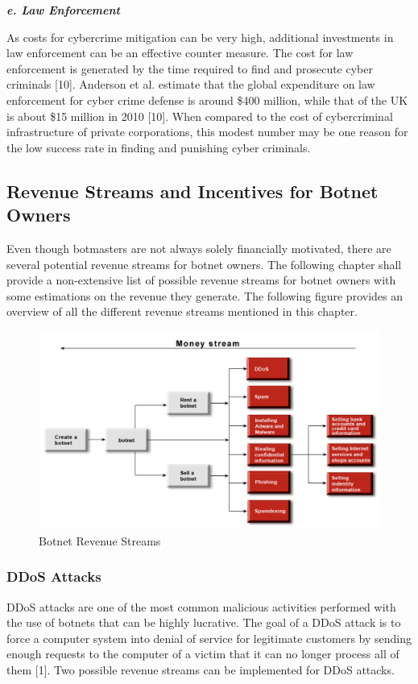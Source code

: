 			\textbf{\textit{e. Law Enforcement}}
			
		As costs for cybercrime mitigation can be very high, additional investments in law enforcement can be an effective counter measure. The cost for law enforcement is generated by the time required to find and prosecute cyber criminals [10]. Anderson et al. estimate that the global expenditure on law enforcement for cyber crime defense is around \$400 million, while that of the UK is about \$15 million in 2010 [10]. When compared to the cost of cybercriminal infrastructure of private corporations, this modest number may be one reason for the low success rate in finding and punishing cyber criminals. 
		
	\subsection{Revenue Streams and Incentives for Botnet Owners}
		Even though botmasters are not always solely financially motivated, there are several potential revenue streams for botnet owners. The following chapter shall provide a non-extensive list of possible revenue streams for botnet owners with some estimations on the revenue they generate. The following figure provides an overview of all the different revenue streams mentioned in this chapter.
		
		
\begin{figure}[ht]
\begin{center} \includegraphics[scale=0.6]{Talk11/RevenueStreams} \end{center}
\caption{Botnet Revenue Streams}
\label{label}
\end{figure}
		
		\subsubsection{DDoS Attacks}
		DDoS attacks are one of the most common malicious activities performed with the use of botnets that can be highly lucrative. The goal of a DDoS attack is to force a computer system into denial of service for legitimate customers by sending enough requests to the computer of a victim that it can no longer process all of them [1]. Two possible revenue streams can be implemented for DDoS attacks.

